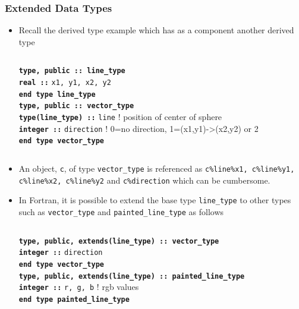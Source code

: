 \documentclass[slidestop,mathserif,compress,xcolor=svgnames]{beamer}
\newcommand{\bftt}[1]{\textbf{\texttt{#1}}}
\newenvironment{bblock}[0]
{
\begin{beamerboxesrounded}[upper=uppercol1,lower=lowercol1,shadow=true]}
{\end{beamerboxesrounded}}
\begin{document}
\begin{frame}[allowframebreaks]
  \frametitle{\small Extended Data Types}
  \begin{itemize}
    \item Recall the derived type example which has as a component another derived type
    \begin{columns}
      \column{8.5cm}
      \begin{bblock}{}
        \begin{tabbing}
          \bftt{ty}\=\bftt{pe, public :: line\_type} \\
          \> \bftt{real ::} \texttt{x1, y1, x2, y2} \\
          \bftt{end type line\_type} \\
          \bftt{type, public :: vector\_type} \\
          \> \bftt{type(line\_type) ::} \texttt{line} ! position of center of sphere\\
          \> \bftt{integer ::} \texttt{direction} ! 0=no direction, 1=(x1,y1)->(x2,y2) or 2\\
          \bftt{end type vector\_type} 
        \end{tabbing}
      \end{bblock}
    \end{columns}
    \item An object, \texttt{c}, of type \texttt{vector\_type} is referenced as \texttt{c\%line\%x1, c\%line\%y1, c\%line\%x2, c\%line\%y2} and \texttt{c\%direction} which can be cumbersome.
    \item In Fortran, it is possible to extend the base type \texttt{line\_type} to other types such as \texttt{vector\_type} and \texttt{painted\_line\_type} as follows
    \begin{columns}
      \column{9cm}
      \begin{bblock}{}
        \begin{tabbing}
          \bftt{ty}\=\bftt{pe, public, extends(line\_type) :: vector\_type} \\
          \> \bftt{integer ::} \texttt{direction} \\
          \bftt{end type vector\_type} \\
          \bftt{type, public, extends(line\_type) :: painted\_line\_type} \\
          \> \bftt{integer ::} \texttt{r, g, b} ! rgb values\\
          \bftt{end type painted\_line\_type}
        \end{tabbing}

\end{bblock}
\end{columns}
\end{itemize}
\end{frame}
\end{document}
